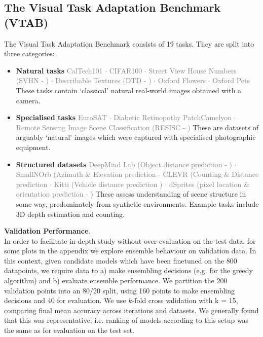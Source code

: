 \documentclass{article} \usepackage{iclr2021_conference,times}
\begin{document}
\subsection{The Visual Task Adaptation Benchmark (VTAB)}
\label{app:vtab}
The Visual Task Adaptation Benchmark consists of 19 tasks. They are split into three categories:
\begin{itemize}
    \item \textbf{Natural tasks}
    \small{\textcolor{gray}{CalTech101 \citep{caltech101} $\cdot$ CIFAR100 \citep{cifar100} $\cdot$ Street View House Numbers (SVHN - \citet{svhn}) $\cdot$ Describable Textures (DTD - \citet{dtd}) $\cdot$ Oxford Flowers \citep{flowers} $\cdot$ Oxford Pets \citep{pets}}}
    \normalsize These tasks contain `classical' natural real-world images obtained with a camera.
    \item \textbf{Specialised tasks}
    \small{\textcolor{gray}{EuroSAT \citep{eurosat} $\cdot$ Diabetic Retinopothy \citep{retino} PatchCamelyon \citep{camelyon} $\cdot$ Remote Sensing Image Scene Classification (RESISC - \citet{resisc})
    }}
    \normalsize These are datasets of arguably `natural' images which were captured with specialised photographic equipment.
    \item \textbf{Structured datasets}
    \small{\textcolor{gray}{
    DeepMind Lab (Object distance prediction - \citet{zhai2019largescale}) $\cdot$ SmallNOrb (Azimuth \& Elevation prediction - \citet{smallnorb} CLEVR (Counting \& Distance prediction \citet{clevr} $\cdot$ Kitti (Vehicle distance prediction \citet{kitti}) $\cdot$ dSprites (pixel location \& orientation prediction - \citet{dsprites})
    }}
    \normalsize These assess understanding of scene structure in some way, predominately from synthetic environments. Example tasks include 3D depth estimation and counting.
\end{itemize}

\textbf{Validation Performance}.\\
In order to facilitate in-depth study without over-evaluation on the test data, for some plots in the appendix we explore ensemble behaviour on validation data. In this context, given candidate models which have been finetuned on the 800 datapoints, we require data to a) make ensembling decisions (e.g. for the greedy algorithm) and b) evaluate ensemble performance.
We partition the 200 validation points into an 80/20 split, using 160 points to make ensembling decisions and 40 for evaluation. We use $k$-fold cross validation with k = 15, comparing final mean accuracy across iterations and datasets. We generally found that this was representative; i.e. ranking of models according to this setup was the same as for evaluation on the test set.
\end{document}
